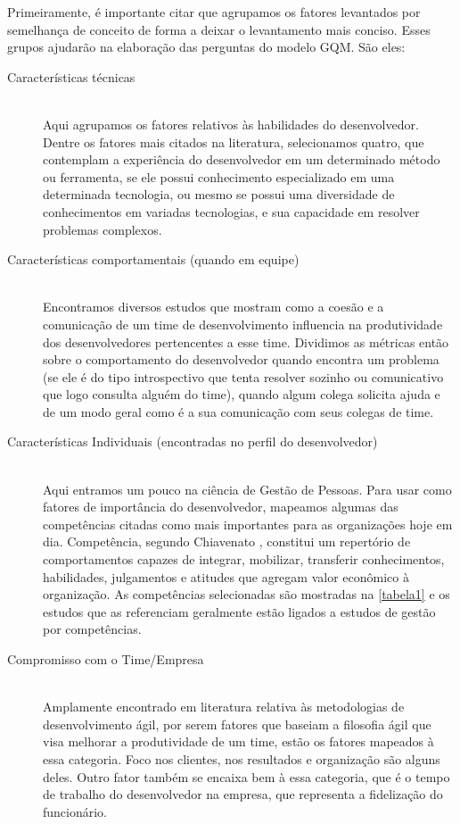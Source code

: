 Primeiramente, é importante citar que agrupamos os fatores levantados por semelhança de conceito de forma a deixar o levantamento mais conciso. Esses grupos ajudarão na elaboração das perguntas do modelo GQM. São eles:


\begin{description}
	\item[Características técnicas] \hfill \\
	Aqui agrupamos os fatores relativos às habilidades do desenvolvedor. Dentre os fatores mais citados na literatura, selecionamos quatro, que contemplam a experiência do desenvolvedor em um determinado método ou ferramenta, se ele possui conhecimento especializado em uma determinada tecnologia, ou mesmo se possui uma diversidade de conhecimentos em variadas tecnologias, e sua capacidade em resolver problemas complexos.
	
	\item[Características comportamentais (quando em equipe)] \hfill \\
	Encontramos diversos estudos que mostram como a coesão e a comunicação de um time de desenvolvimento influencia na produtividade dos desenvolvedores pertencentes a esse time. Dividimos as métricas então sobre o comportamento do desenvolvedor quando encontra um problema (se ele é do tipo introspectivo que tenta resolver sozinho ou comunicativo que logo consulta alguém do time), quando algum colega solicita ajuda e de um modo geral como é a sua comunicação com seus colegas de time.
	
	\item[Características Individuais (encontradas no perfil do desenvolvedor)] \hfill \\
	Aqui entramos um pouco na ciência de Gestão de Pessoas. Para usar como fatores de importância do desenvolvedor, mapeamos algumas das competências citadas como mais importantes para as organizações hoje em dia. Competência, segundo Chiavenato \cite{Chiavenato2008}, constitui um repertório de comportamentos capazes de integrar, mobilizar, transferir conhecimentos, habilidades, julgamentos e atitudes que agregam valor econômico à organização. As competências selecionadas são mostradas na \autoref{tabela1} e os estudos que as referenciam geralmente estão ligados a estudos de gestão por competências.
	
	\item[Compromisso com o Time/Empresa] \hfill \\
	Amplamente encontrado em literatura relativa às metodologias de desenvolvimento ágil, por serem fatores que baseiam a filosofia ágil que visa melhorar a produtividade de um time, estão os fatores mapeados à essa categoria. Foco nos clientes, nos resultados e organização são alguns deles. Outro fator também se encaixa bem à essa categoria, que é o tempo de trabalho do desenvolvedor na empresa, que representa a fidelização do funcionário.
	
\end{description}

